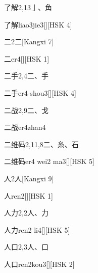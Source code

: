 \begin{entry}{了解}{2,13}{⼅、⾓}
  \begin{phonetics}{了解}{liao3jie3}[][HSK 4]
  \end{phonetics}
\end{entry}

\begin{entry}{二}{2}{⼆}[Kangxi 7]
  \begin{phonetics}{二}{er4}[][HSK 1]
  \end{phonetics}
\end{entry}

\begin{entry}{二手}{2,4}{⼆、⼿}
  \begin{phonetics}{二手}{er4 shou3}[][HSK 4]
  \end{phonetics}
\end{entry}

\begin{entry}{二战}{2,9}{⼆、⼽}
  \begin{phonetics}{二战}{er4zhan4}
  \end{phonetics}
\end{entry}

\begin{entry}{二维码}{2,11,8}{⼆、⽷、⽯}
  \begin{phonetics}{二维码}{er4 wei2 ma3}[][HSK 5]
  \end{phonetics}
\end{entry}

\begin{entry}{人}{2}{⼈}[Kangxi 9]
  \begin{phonetics}{人}{ren2}[][HSK 1]
  \end{phonetics}
\end{entry}

\begin{entry}{人力}{2,2}{⼈、⼒}
  \begin{phonetics}{人力}{ren2 li4}[][HSK 5]
  \end{phonetics}
\end{entry}

\begin{entry}{人口}{2,3}{⼈、⼝}
  \begin{phonetics}{人口}{ren2kou3}[][HSK 2]
  \end{phonetics}
\end{entry}

